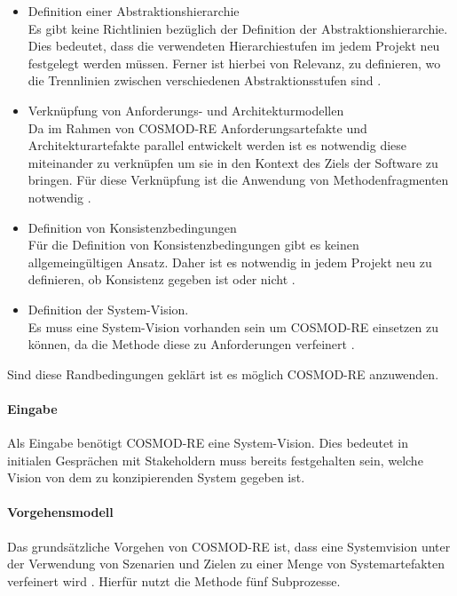 \begin{itemize}
\item Definition einer Abstraktionshierarchie \\
Es gibt keine Richtlinien bezüglich der Definition der Abstraktionshierarchie. Dies bedeutet, dass die verwendeten Hierarchiestufen im jedem Projekt neu festgelegt werden müssen. Ferner ist hierbei von Relevanz, zu definieren, wo die Trennlinien zwischen verschiedenen Abstraktionsstufen sind \cite{sikora}.
\item Verknüpfung von Anforderungs- und Architekturmodellen \\
Da im Rahmen von COSMOD-RE Anforderungsartefakte und Architekturartefakte parallel entwickelt werden ist es notwendig diese miteinander zu verknüpfen um sie in den Kontext des Ziels der Software zu bringen. Für diese Verknüpfung ist die Anwendung von Methodenfragmenten notwendig \cite{sikora}.
\item Definition von Konsistenzbedingungen \\
Für die Definition von Konsistenzbedingungen gibt es keinen allgemeingültigen Ansatz. Daher ist es notwendig in jedem Projekt neu zu definieren, ob Konsistenz gegeben ist oder nicht \cite{sikora}.\\
\item Definition der System-Vision. \\
Es muss eine System-Vision vorhanden sein um COSMOD-RE einsetzen zu können, da die Methode diese zu Anforderungen verfeinert \cite{pohl}.\\
\end{itemize}

Sind diese Randbedingungen geklärt ist es möglich COSMOD-RE anzuwenden.\\

\paragraph{Eingabe}
Als Eingabe benötigt COSMOD-RE eine System-Vision. Dies bedeutet in initialen Gesprächen mit Stakeholdern muss bereits festgehalten sein, welche Vision von dem zu konzipierenden System gegeben ist.\\

\paragraph{Vorgehensmodell}
Das grundsätzliche Vorgehen von COSMOD-RE ist, dass eine Systemvision unter der Verwendung von Szenarien und Zielen zu einer Menge von Systemartefakten verfeinert wird \cite{Pohl}. Hierfür nutzt die Methode fünf Subprozesse. \\

